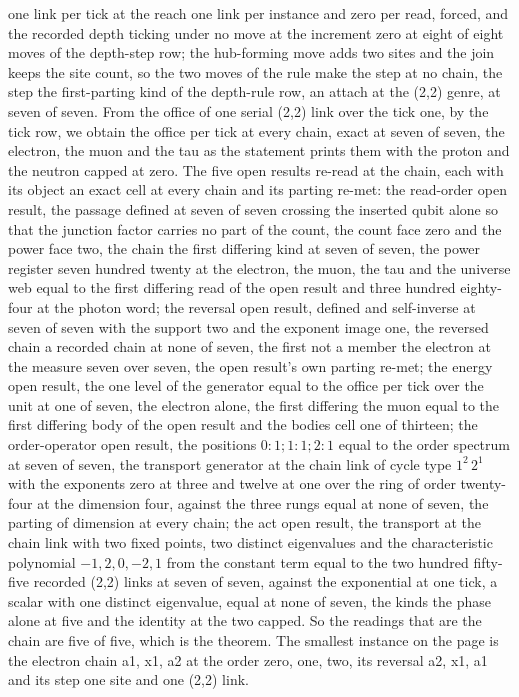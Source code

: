 \begin{chproof}
one link per tick at the reach one link per instance and zero per read, forced, and the recorded depth ticking under no move at the increment zero at eight of eight moves of the depth-step row; the hub-forming move adds two sites and the join keeps the site count, so the two moves of the rule make the step at no chain, the step the first-parting kind of the depth-rule row, an attach at the (2,2) genre, at seven of seven. From the office of one serial (2,2) link over the tick one, by the tick row, we obtain the office per tick at every chain, exact at seven of seven, the electron, the muon and the tau as the statement prints them with the proton and the neutron capped at zero. The five open results re-read at the chain, each with its object an exact cell at every chain and its parting re-met: the read-order open result, the passage defined at seven of seven crossing the inserted qubit alone so that the junction factor carries no part of the count, the count face zero and the power face two, the chain the first differing kind at seven of seven, the power register seven hundred twenty at the electron, the muon, the tau and the universe web equal to the first differing read of the open result and three hundred eighty-four at the photon word; the reversal open result, defined and self-inverse at seven of seven with the support two and the exponent image one, the reversed chain a recorded chain at none of seven, the first not a member the electron at the measure seven over seven, the open result's own parting re-met; the energy open result, the one level of the generator equal to the office per tick over the unit at one of seven, the electron alone, the first differing the muon equal to the first differing body of the open result and the bodies cell one of thirteen; the order-operator open result, the positions $0{:}1;1{:}1;2{:}1$ equal to the order spectrum at seven of seven, the transport generator at the chain link of cycle type $1^{2}\,2^{1}$ with the exponents zero at three and twelve at one over the ring of order twenty-four at the dimension four, against the three rungs equal at none of seven, the parting of dimension at every chain; the act open result, the transport at the chain link with two fixed points, two distinct eigenvalues and the characteristic polynomial $-1, 2, 0, -2, 1$ from the constant term equal to the two hundred fifty-five recorded (2,2) links at seven of seven, against the exponential at one tick, a scalar with one distinct eigenvalue, equal at none of seven, the kinds the phase alone at five and the identity at the two capped. So the readings that are the chain are five of five, which is the theorem. The smallest instance on the page is the electron chain a1, x1, a2 at the order zero, one, two, its reversal a2, x1, a1 and its step one site and one (2,2) link.


\end{chproof}
